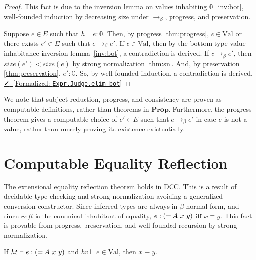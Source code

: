 \documentclass{lmcs}
\newcommand{\val}{\text{Val}}
\newcommand{\leanlink}[2]{
  \href{#1}{\textcolor{black}\faCheck~[Formalized: \texttt{#2}]}%
}
\newcommand{\arr}{\rightarrow}
\newcommand{\barr}{\arr_{\beta}}
\begin{document}
\begin{proof}
  This fact is due to the inversion lemma on values inhabiting \(\mathbb{0}\)~\ref{inv:bot}, well-founded induction by decreasing size under \(\barr\), progress, and preservation.

  Suppose \(e \in E\) such that \(h \vdash e : \mathbb{0}\). Then, by progress \ref{thm:progress}, \(e \in \val\) or there exists \(e' \in E\) such that \(e \barr e'\). If \(e \in \val\), then by the bottom type value inhabitance inversion lemma~\eqref{inv:bot}, a contradiction is derived. If \(e \barr e'\), then \(size(e') < size(e)\) by strong normalization \ref{thm:sn}. And, by preservation \ref{thm:preservation}, \(e' : \mathbb{0}\). So, by well-founded induction, a contradiction is derived.\\
\noindent \leanlink{https://github.com/lexzaiello/DCC/blob/4b0ea7f932ae69ac6d11658d69d3dcc0c261f4e7/Dcc/Metatheory/Consistent.lean\#L7}{Expr.Judge.elim\_bot}
\end{proof}

We note that subject-reduction, progress, and consistency are proven as computable definitions, rather than theorems in \(\textbf{Prop}\). Furthermore, the progress theorem gives a computable choice of \(e' \in E\) such that \(e \barr e'\) in case \(e\) is not a value, rather than merely proving its existence existentially.

\section{Computable Equality Reflection}\label{extensional}

The extensional equality reflection theorem holds in DCC. This is a result of decidable type-checking and strong normalization avoiding a generalized conversion constructor. Since inferred types are always in \(\beta\)-normal form, and since \(refl\) is the canonical inhabitant of equality, \(e : \comb[= A][x][y]\) iff \(x \equiv y\). This fact is provable from progress, preservation, and well-founded recursion by strong normalization.

\begin{lem}\label{lem:ext}
  If \(ht \vdash e : \comb[= A][x][y]\) and \(hv \vdash e \in \val\), then \(x \equiv y\).
\end{lem}
\end{document}
